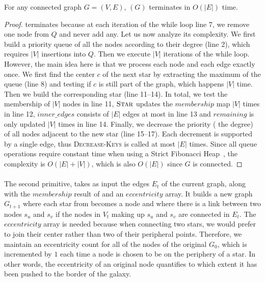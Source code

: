 \begin{prop}
  \label{prop:gtx_time_extractstar}
  For any connected graph $G=(V,E)$, \extractStar$(G)$ terminates in $O(|E|)$ time.
\end{prop}
\begin{proof}
\extractStar{} terminates because at each iteration of the while loop line 7, we remove one node
from $Q$ and never add any. Let us now analyze its complexity. We first build a priority queue of
all the nodes according to their degree (line 2), which requires $|V|$ insertions into $Q$. Then
we execute $|V|$ iterations of the while loop. However, the main idea here is that we process each
node and each edge exactly once. We first find the center $c$ of the next star by extracting the
maximum of the queue (line 8) and testing if $c$ is still part of the graph, which happens $|V|$
time. Then we build the corresponding star (line 11--14). In total, we test the membership of $|V|$
nodes in line 11, $\textsc{Star}$ updates the $membership$ map $|V|$ times in line 12,
$inner\_edges$ consists of $|E|$ edges at most in line 13 and $remaining$ is only updated $|V|$
times in line 14. Finally, we decrease the priority (\ie{} the degree) of all nodes adjacent to the
new star (line 15--17). Each decrement is supported by a single edge, thus \textsc{Decrease-Keys} is
called at most $|E|$ times. Since all queue operations require constant time when using a Strict
Fibonacci Heap~\autocite{FibonacciHeaps12}, the complexity is $O(|E|+|V|)$, which is also $O(|E|)$
since $G$ is connected.
\end{proof}

\paragraph{\collapseStar{}}\label{par:collapsestar}%

The second primitive, \collapseStar{} takes as input the edges $E_t$ of the current graph, along
with the $membership$ result of \extractStar{} and an $eccentricity$ array. It builds a new graph
$G_{t+1}$ where each star from \extractStar{} becomes a node and where there is a link between two
nodes $s_u$ and $s_v$ if the nodes in $V_t$ making up $s_u$ and $s_v$ are connected in $E_t$. The
$eccentricity$ array is needed because when connecting two stars, we would prefer to join their
center rather than two of their peripheral points. Therefore, we maintain an eccentricity count for
all of the nodes of the original $G_0$, which is incremented by $1$ each time a node is chosen to be
on the periphery of a star. In other words, the eccentricity of an original node quantifies to which
extent it has been pushed to the border of the galaxy.

